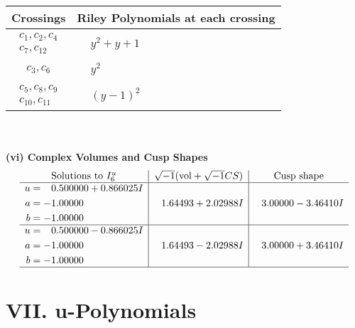 \documentclass[1p]{elsarticle_modified}
\theoremstyle{definition}
\newcommand{\I}{\sqrt{-1}}
\begin{document}
\begin{tabular}{m{50pt}|m{274pt}}
Crossings & \hspace{64pt}Riley Polynomials at each crossing \\
\hline $$\begin{aligned}c_{1},c_{2},c_{4}\\c_{7},c_{12}\end{aligned}$$&$\begin{aligned}
&y^2+y+1
\end{aligned}$\\
\hline $$\begin{aligned}c_{3},c_{6}\end{aligned}$$&$\begin{aligned}
&y^2
\end{aligned}$\\
\hline $$\begin{aligned}c_{5},c_{8},c_{9}\\c_{10},c_{11}\end{aligned}$$&$\begin{aligned}
&(y-1)^2
\end{aligned}$\\
\hline
\end{tabular}\\~\\
\newpage\flushleft \textbf{(vi) Complex Volumes and Cusp Shapes}
$$\begin{array}{c|c|c}  
\text{Solutions to }I^u_{6}& \I (\text{vol} + \sqrt{-1}CS) & \text{Cusp shape}\\
 \hline 
\begin{aligned}
u &= \phantom{-}0.500000 + 0.866025 I \\
a &= -1.00000\phantom{ +0.000000I} \\
b &= -1.00000\phantom{ +0.000000I}\end{aligned}
 & \phantom{-}1.64493 + 2.02988 I & \phantom{-}3.00000 - 3.46410 I \\ \hline\begin{aligned}
u &= \phantom{-}0.500000 - 0.866025 I \\
a &= -1.00000\phantom{ +0.000000I} \\
b &= -1.00000\phantom{ +0.000000I}\end{aligned}
 & \phantom{-}1.64493 - 2.02988 I & \phantom{-}3.00000 + 3.46410 I\\
 \hline 
 \end{array}$$\newpage
\newpage\renewcommand{\arraystretch}{1}
\centering \section*{ VII. u-Polynomials}
\end{document}
